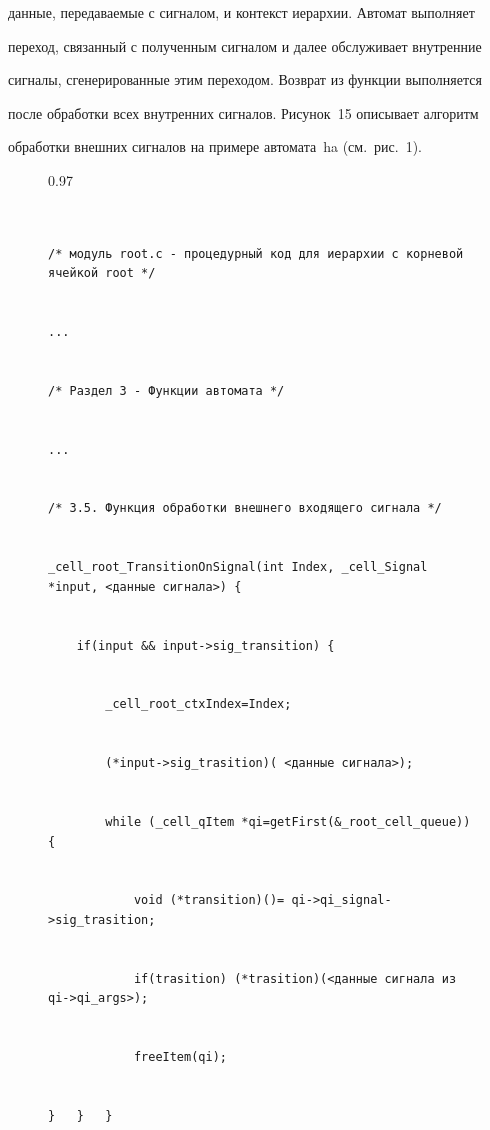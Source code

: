 данные, передаваемые с сигналом, и контекст иерархии. Автомат выполняет 


переход, связанный с полученным сигналом и далее обслуживает внутренние 


сигналы, сгенерированные этим переходом. Возврат из функции выполняется 


после обработки всех внут\-рен\-них сигналов. Рисунок~15 описывает алгоритм 


обработки внешних сигналов на примере автомата~ha (см.\ рис.~1).


      


\begin{figure}\scriptsize %


\begin{center}


\begin{fmpage}{0.97\textwidth}


\begin{verbatim}


/* модуль root.c - процедурный код для иерархии с корневой ячейкой root */ 


... 


/* Раздел 3 - Функции автомата */ 


... 


/* 3.5. Функция обработки внешнего входящего сигнала */ 


_cell_root_TransitionOnSignal(int Index, _cell_Signal *input, <данные сигнала>) { 


    if(input && input->sig_transition) { 


        _cell_root_ctxIndex=Index;  


        (*input->sig_trasition)( <данные сигнала>); 


        while (_cell_qItem *qi=getFirst(&_root_cell_queue)) { 


            void (*transition)()= qi->qi_signal->sig_trasition; 


            if(trasition) (*trasition)(<данные сигнала из qi->qi_args>); 


            freeItem(qi); 


}   }   }


\end{verbatim}


\end{fmpage}


\end{center}


\vspace*{-6pt}




\end{figure}






